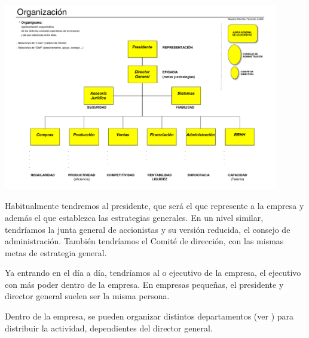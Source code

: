 \documentclass[nochap,palatino,shortheader]{apuntes}
\begin{document}
\begin{center}
\includegraphics[width=0.9\textwidth]{img/organizacionEmpresa.png}
\label{fig:organizacionEmpresa}
\end{center}


Habitualmente tendremos al presidente, que será el que represente a la empresa y además el que establezca las estrategias generales. En un nivel similar, tendríamos la junta general de accionistas y su versión reducida, el consejo de administración. También tendríamos el Comité de dirección, con las mismas metas de estrategia general.

Ya entrando en el día a día, tendríamos al  o ejecutivo de la empresa, el ejecutivo con más poder dentro de la empresa. En empresas pequeñas, el presidente y director general suelen ser la misma persona.

Dentro de la empresa, se pueden organizar distintos departamentos (ver ) para distribuir la actividad, dependientes del director general.
\end{document}
